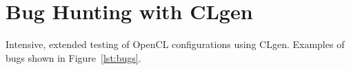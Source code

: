 \section{Bug Hunting with CLgen}

Intensive, extended testing of OpenCL configurations using CLgen. Examples of bugs shown in Figure~\ref{lst:bugs}.



